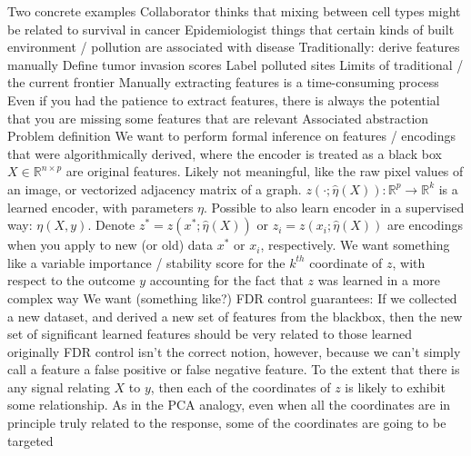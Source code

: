 \documentclass[11pt]{article}
\title{}
\author{Kris Sankaran}
\begin{document}
\maketitle

\begin{outline}
\1 Two concrete examples
  \2 Collaborator thinks that mixing between cell types might be related to
  survival in cancer
  \2 Epidemiologist things that certain kinds of built environment / pollution
  are associated with disease
  \2 Traditionally: derive features manually
    \3 Define tumor invasion scores
    \3 Label polluted sites
  \2 Limits of traditional / the current frontier
    \3 Manually extracting features is a time-consuming process
    \3 Even if you had the patience to extract features, there is always the
    potential that you are missing some features that are relevant
\1 Associated abstraction
  \2 Problem definition
    \3 We want to perform formal inference on features / encodings that were
    algorithmically derived, where the encoder is treated as a black box
      \4 $X \in \mathbb{R}^{n \times p}$ are original features. Likely
      not meaningful, like the raw pixel values of an image, or vectorized
      adjacency matrix of a graph.
      \4 $z\left(\cdot; \hat{\eta}\left(X\right)\right) : \mathbb{R}^{p} \to
      \mathbb{R}^{k}$ is a learned encoder, with parameters $\eta$. Possible to
      also learn encoder in a supervised way: $\eta\left(X, y\right)$.
      \4 Denote $z^{\ast} = z\left(x^{\ast}; \hat{\eta}\left(X\right)\right)$ or
      $z_{i} = z\left(x_{i}; \hat{\eta}\left(X\right)\right)$ are encodings when
      you apply to new (or old) data $x^\ast$ or $x_{i}$, respectively.
      \4 We want something like a variable importance / stability score for the
      $k^{th}$ coordinate of $z$, with respect to the outcome $y$ accounting for
      the fact that $z$ was learned in a more complex way
    \3 We want (something like?) FDR control guarantees: If we collected a new
    dataset, and derived a new set of features from the blackbox, then the new
    set of significant learned features should be very related to those learned
    originally
      \4 FDR control isn't the correct notion, however, because we can't simply
      call a feature a false positive or false negative feature.
      \4 To the extent that there is any signal relating $X$ to $y$, then each
      of the coordinates of $z$ is likely to exhibit some relationship. As in
      the PCA analogy, even when all the coordinates are in principle truly
      related to the response, some of the coordinates are going to be targeted

\end{outline}
\end{document}
